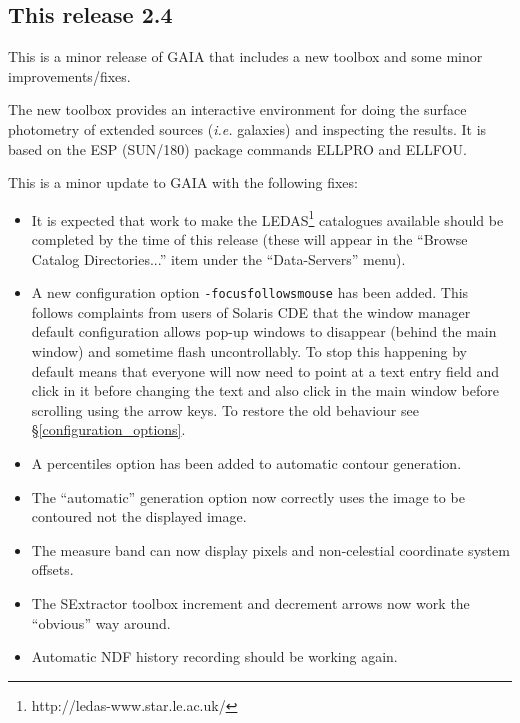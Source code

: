 \documentclass[twoside,11pt]{article}
\newcommand{\htmladdnormallinkfoot}[2]{#1\footnote{#2}}
\newcommand{\hyperref}[4]{#2\ref{#4}#3}
\newcommand{\xref}[3]{#1}
\renewcommand{\_}{\texttt{\symbol{95}}}
\newcommand{\mytt}[1]{{\tt{#1}}}
\begin{document}
\subsection{This release 2.4}
This is a minor release of GAIA that includes a new toolbox and some
minor improvements/fixes.

The new toolbox provides an interactive environment for doing the
surface photometry of extended sources ({\em i.e.} galaxies) and inspecting
the results. It is based on the ESP (\xref{SUN/180}{sun180}{}) package
commands ELLPRO and ELLFOU.

This is a minor update to GAIA with the following fixes:
\begin{itemize}
\item It is expected that work to make the 
      \htmladdnormallinkfoot{LEDAS}{http://ledas-www.star.le.ac.uk/}
      catalogues available should be completed by the time of this
      release (these will appear in the ``Browse Catalog
      Directories...'' item under the ``Data-Servers'' menu).

\item A new configuration option \mytt{-focus\_follows\_mouse} has been
      added. This follows complaints from users of Solaris CDE that
      the window manager default configuration allows pop-up windows
      to disappear (behind the main window) and sometime flash
      uncontrollably. To stop this happening by default means that
      everyone will now need to point at a text entry field and click
      in it before changing the text and also click in the main window
      before scrolling using the arrow keys. To restore the old
      behaviour see
      \hyperref{configuration options}{\S}{}{configuration_options}.

\item A percentiles option has been added to automatic contour
      generation.

\item The ``automatic'' generation option now correctly uses the image
      to be contoured not the displayed image. 

\item The measure band can now display pixels and non-celestial
      coordinate system offsets.

\item The SExtractor toolbox increment and decrement arrows now work
      the ``obvious'' way around.

\item Automatic NDF history recording should be working again.


\end{itemize}
\end{document}
